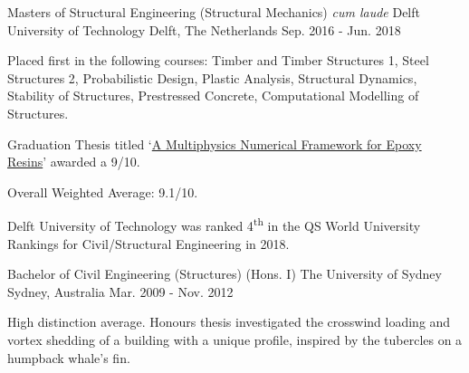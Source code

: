 

\begin{cventries}

    \cventry
    {Masters of Structural Engineering (Structural Mechanics) \emph{cum laude}} %
    {Delft University of Technology} %
    {Delft, The Netherlands} %
    {Sep. 2016 - Jun. 2018} %
    {
      \begin{cvitems} %
        \item {Placed first in the following courses: Timber and Timber Structures 1, Steel Structures 2, Probabilistic Design, Plastic Analysis, Structural Dynamics, Stability of Structures, Prestressed Concrete, Computational Modelling of Structures.}
        \item {Graduation Thesis titled `\href{https://repository.tudelft.nl/islandora/object/uuid\%3A86d469f3-0c44-4f45-9396-ec296d87031f?collection=education}{A Multiphysics Numerical Framework for Epoxy Resins}' awarded a 9/10.}
        \item {Overall Weighted Average: 9.1/10.}
        \item {Delft University of Technology was ranked 4\textsuperscript{th} in the QS World University Rankings for Civil/Structural Engineering in 2018.}
      \end{cvitems}
    }
    \cventry
    {Bachelor of Civil Engineering (Structures) (Hons. I)} %
    {The University of Sydney} %
    {Sydney, Australia} %
    {Mar. 2009 - Nov. 2012} %
    {
      \begin{cvitems} %
        \item {High distinction average. Honours thesis investigated the crosswind loading and vortex shedding of a building with a unique profile, inspired by the tubercles on a humpback whale's fin.}
      \end{cvitems}
    }

\end{cventries}
